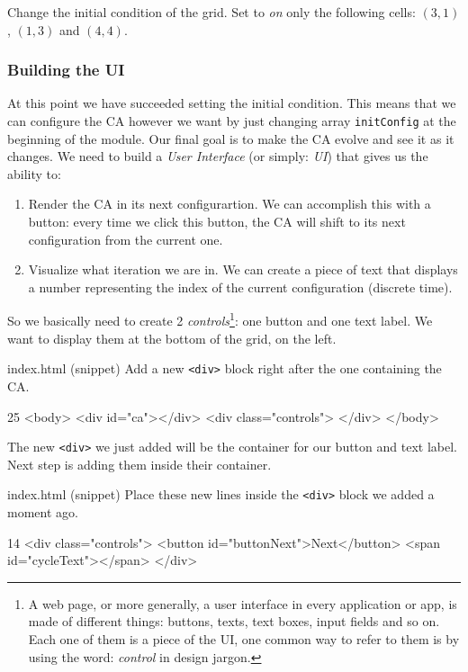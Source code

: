 \begin{problem}
\label{prob:changeinit}
Change the initial condition of the grid. Set to \textit{on} only the following
cells: $(3,1)$, $(1,3)$ and $(4,4)$.
\end{problem}

\subsubsection{Building the UI}
At this point we have succeeded setting the initial condition. This means that we can configure the CA however
we want by just changing array \texttt{initConfig} at the beginning of the module. Our final goal is to
make the CA evolve and see it as it changes. We need to build a \textit{User Interface} (or simply: \textit{UI})
that gives us the ability to:

\begin{enumerate}
\item Render the CA in its next configurartion. We can accomplish this with a button: every time we
click this button, the CA will shift to its next configuration from the current one.
\item Visualize what iteration we are in. We can create a piece of text that displays a number
representing the index of the current configuration (discrete time).
\end{enumerate}

So we basically need to create 2
\textit{controls}\footnote{A web page, or more generally, a user interface in every application or app, is made
of different things: buttons, texts, text boxes, input fields and so on. Each one of them is a piece of the UI,
one common way to refer to them is by using the word: \textit{control} in design jargon.}: one button and
one text label. We want to display them at the bottom of the grid, on the left.

\begin{programcode}{index.html (snippet)}
Add a new \texttt{<div>} block right after the one containing the CA.
\begin{codehtmlh1}{2}{5}
<body>
  <div id="ca"></div>
  <div class="controls">
  </div>
</body>
\end{codehtmlh1}
\end{programcode}

The new \texttt{<div>} we just added will be the container for our button and text label. Next step
is adding them inside their container.

\begin{programcode}{index.html (snippet)}
Place these new lines inside the \texttt{<div>} block we added a moment ago.
\begin{codehtmlh1}{1}{4}
<div class="controls">
  <button id="buttonNext">Next</button>
  <span id="cycleText"></span>
</div>
\end{codehtmlh1}
\end{programcode}

